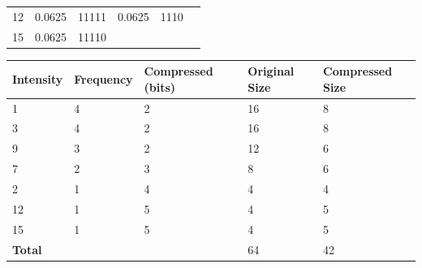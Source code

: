 \documentclass[12pt,a4paper]{article}
\begin{document}
\begin{enumerate}
\begin{table}[H]
\begin{tabular}{|l|l|l|l|l|l|l|l|l|l|l|l|l|}
			12                 & 0.0625               & 11111         & 0.0625              & 1110      & \multicolumn{8}{l|}{}                                                                                                                 \\ \cline{1-1} \cline{3-13} 
			15                 & 0.0625               & 11110         & \multicolumn{10}{l|}{}                                                                                                                                                  \\ \hline
			\end{tabular}
			\end{table}

			\begin{table}[H]
				\begin{tabular}{|l|l|l|l|l|}
				\hline
				\textbf{Intensity} & \textbf{Frequency} & \textbf{Compressed (bits)} & \textbf{Original Size} & \textbf{Compressed Size} \\ \hline
				1                  & 4                  & 2                          & 16                     & 8                        \\ \hline
				3                  & 4                  & 2                          & 16                     & 8                        \\ \hline
				9                  & 3                  & 2                          & 12                     & 6                        \\ \hline
				7                  & 2                  & 3                          & 8                      & 6                        \\ \hline
				2                  & 1                  & 4                          & 4                      & 4                        \\ \hline
				12                 & 1                  & 5                          & 4                      & 5                        \\ \hline
				15                 & 1                  & 5                          & 4                      & 5                        \\ \hline
				\multicolumn{3}{|l|}{\textbf{Total}}                                 & 64                     & 42                       \\ \hline
				\end{tabular}
				\end{table}	


\end{enumerate}
\end{document}
